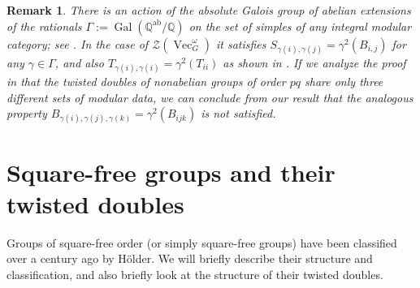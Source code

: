 \documentclass[a4paper, 10pt]{book}
\newtheorem{Rem}[theorem]{Remark}
\theoremstyle{definition}
\numberwithin{equation}{chapter}
\newcommand\Vect{\operatorname{Vec}}
\newcommand\Q{\mathbb Q}
\newcommand\CTR{\mathcal Z}
\newcommand\Gal{\operatorname{Gal}}
\newcommand\ab{{\operatorname{ab}}}
\begin{document}
\begin{Rem}\rm
  There is an action of the absolute Galois group of abelian extensions  of the rationals $\Gamma:=\Gal(\Q^\ab/\Q)$ on the set of simples of any integral modular category; see \cite[Appendix]{EtiNikOst:FC}. In the case of $\CTR(\Vect_G^\omega)$ it satisfies $S_{\gamma(i),\gamma(j)}=\gamma^2(B_{i,j})$ for any $\gamma\in\Gamma$, and also $T_{\gamma(i),\gamma(i)}=\gamma^2(T_{ii})$ as shown in  \cite{MR3435813}. If we analyze the proof in \cite{2017arXiv170802796M} that the twisted doubles of nonabelian groups of order $pq$ share only three different sets of modular data, we can conclude from our result that the analogous property $B_{\gamma(i),\gamma(j),\gamma(k)}=\gamma^2(B_{ijk})$ is not satisfied. 
\end{Rem}

\section{Square-free groups and their twisted doubles} %
\label{sub:twisted_doubles_of_square-free groups}
Groups of square-free order (or simply square-free groups) have been classified over a century ago by H\"older\cite{Hoelder1895}. We will briefly describe their structure and classification, and also briefly look at the structure of their twisted doubles.
\end{document}
